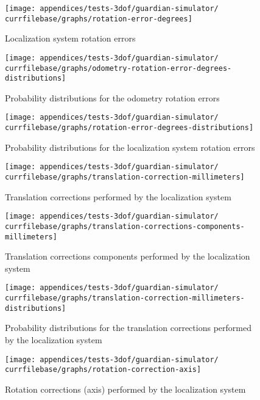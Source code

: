 \begin{figure}[H]
	\centering
	\texttt{[image: appendices/tests-3dof/guardian-simulator/\\currfilebase/graphs/rotation-error-degrees]}
	\caption{Localization system rotation errors}
\end{figure}


\begin{figure}[H]
	\centering
	\texttt{[image: appendices/tests-3dof/guardian-simulator/\\currfilebase/graphs/odometry-rotation-error-degrees-distributions]}
	\caption{Probability distributions for the odometry rotation errors}
\end{figure}

\begin{figure}[H]
	\centering
	\texttt{[image: appendices/tests-3dof/guardian-simulator/\\currfilebase/graphs/rotation-error-degrees-distributions]}
	\caption{Probability distributions for the localization system rotation errors}
\end{figure}


\begin{figure}[H]
	\centering
	\texttt{[image: appendices/tests-3dof/guardian-simulator/\\currfilebase/graphs/translation-correction-millimeters]}
	\caption{Translation corrections performed by the localization system}
\end{figure}

\begin{figure}[H]
	\centering
	\texttt{[image: appendices/tests-3dof/guardian-simulator/\\currfilebase/graphs/translation-corrections-components-millimeters]}
	\caption{Translation corrections components performed by the localization system}
\end{figure}

\begin{figure}[H]
	\centering
	\texttt{[image: appendices/tests-3dof/guardian-simulator/\\currfilebase/graphs/translation-correction-millimeters-distributions]}
	\caption{Probability distributions for the translation corrections performed by the localization system}
\end{figure}


\begin{figure}[H]
	\centering
	\texttt{[image: appendices/tests-3dof/guardian-simulator/\\currfilebase/graphs/rotation-correction-axis]}
	\caption{Rotation corrections (axis) performed by the localization system}
\end{figure}

